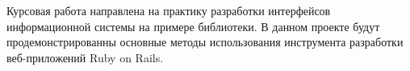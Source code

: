 Курсовая работа направлена на практику разработки интерфейсов информационной системы на
примере библиотеки.
В данном проекте будут продемонстрированны основные методы использования инструмента
разработки веб-приложений Ruby on Rails.
